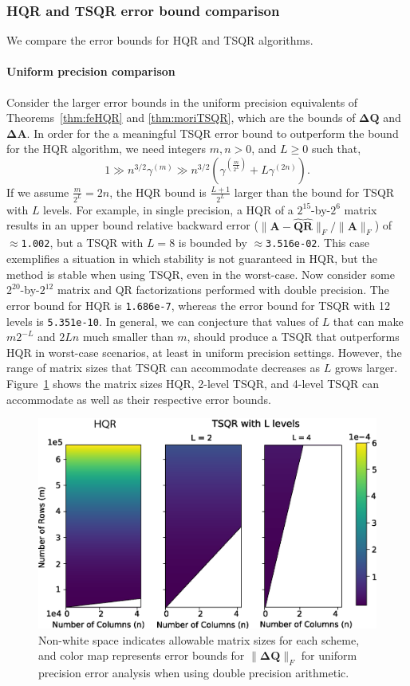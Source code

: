 \documentclass[review,onefignum,onetabnum]{siamart190516}
\newcommand{\bb}[1]{\mathbf{#1}}
\begin{document}
\subsubsection{HQR and TSQR error bound comparison}
\label{sec:HTSQR}
We compare the error bounds for HQR and TSQR algorithms. 
\paragraph{Uniform precision comparison}Consider the larger error bounds in the uniform precision equivalents of Theorems~\ref{thm:feHQR} and \ref{thm:moriTSQR}, which are the bounds of $\bb{\Delta Q}$ and $\bb{\Delta A}$. 
In order for the a meaningful TSQR error bound to outperform the bound for the HQR algorithm, we need integers $m, n > 0$, and $L\geq0$ such that,
\begin{equation*}
1\gg n^{3/2}\gamma^{(m)} \gg n^{3/2}(\gamma^{(\frac{m}{2^L})}+L\gamma^{(2n)}).
\end{equation*}
If we assume $\frac{m}{2^L}=2n$, the HQR bound is $\frac{L+1}{2^L}$ larger than the bound for TSQR with $L$ levels. 
For example, in single precision, a HQR of a $2^{15}$-by-$2^6$ matrix results in an upper bound relative backward error ($\|\bb{A}-\hat{\bb{Q}}\hat{\bb{R}}\|_F/\|\bb{A}\|_F$) of $\approx${\tt1.002}, but a TSQR with $L=8$ is bounded by $\approx${\tt 3.516e-02}. 
This case exemplifies a situation in which stability is not guaranteed in HQR, but the method is stable when using TSQR, even in the worst-case. 
Now consider some $2^{20}$-by-$2^{12}$ matrix and QR factorizations performed with double precision.
The error bound for HQR is {\tt 1.686e-7}, whereas the error bound for TSQR with 12 levels is {\tt 5.351e-10}.
In general, we can conjecture that values of $L$ that can make $m2^{-L}$ and $2Ln$ much smaller than $m$, should produce a TSQR that outperforms HQR in worst-case scenarios, at least in uniform precision settings.
However, the range of matrix sizes that TSQR can accommodate decreases as $L$ grows larger.
Figure~\ref{fig:paramspace} shows the matrix sizes HQR, 2-level TSQR, and 4-level TSQR can accommodate as well as their respective error bounds.\par
\begin{figure}
	\centering
	\includegraphics[width=.45\textwidth]{./figures/paramspace.png}
	\caption{\label{fig:paramspace} Non-white space indicates allowable matrix sizes for each scheme, and color map represents error bounds for $\|\bb{\Delta Q}\|_F$ for uniform precision error analysis when using double precision arithmetic.}
	\vspace{-10pt}	
\end{figure}
\end{document}
